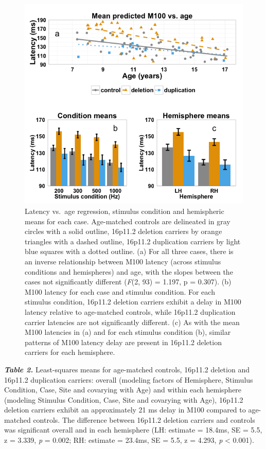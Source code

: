 \documentclass[]{article}
\begin{document}
\begin{figure}[htbp]
\centering
\includegraphics{figure-2-resubmssion.png}
\caption{Latency vs.~age regression, stimulus condition and hemispheric
means for each case. Age-matched controls are delineated in gray circles
with a solid outline, 16p11.2 deletion carriers by orange triangles with
a dashed outline, 16p11.2 duplication carriers by light blue squares
with a dotted outline. (a) For all three cases, there is an inverse
relationship between M100 latency (across stimulus conditions and
hemispheres) and age, with the slopes between the cases not
significantly different (\emph{F}(2, 93) = 1.197, p = 0.307). (b) M100
latency for each case and stimulus condition. For each stimulus
condition, 16p11.2 deletion carriers exhibit a delay in M100 latency
relative to age-matched controls, while 16p11.2 duplication carrier
latencies are not significantly different. (c) As with the mean M100
latencies in (a) and for each stimulus condition (b), similar patterns
of M100 latency delay are present in 16p11.2 deletion carriers for each
hemisphere.}
\end{figure}

\textbf{\emph{Table 2.}} Least-squares means for age-matched controls,
16p11.2 deletion and 16p11.2 duplication carriers: overall (modeling
factors of Hemisphere, Stimulus Condition, Case, Site and covarying with
Age) and within each hemisphere (modeling Stimulus Condition, Case, Site
and covarying with Age), 16p11.2 deletion carriers exhibit an
approximately 21 ms delay in M100 compared to age-matched controls. The
difference between 16p11.2 deletion carriers and controls was
significant overall and in each hemisphere (LH: estimate = 18.4ms, SE =
5.5, z = 3.339, \emph{p} = 0.002; RH: estimate = 23.4ms, SE = 5.5, z =
4.293, \emph{p} \textless{} 0.001).
\end{document}
